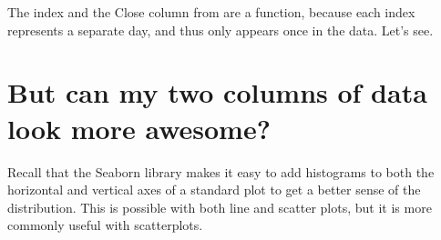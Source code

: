 \documentclass[letterpaper,10pt,english]{jupyterBook}
\begin{document}
\sphinxAtStartPar
{} The index and the Close column from  are a function, because each index represents a separate day, and thus only appears once in the data.  Let’s see.

\begin{sphinxVerbatim}[commandchars=\\\{\}]
  \PYG{p}{[}\PYG{p}{]}   
      
  
  
\end{sphinxVerbatim}

\noindent{}


\section{But can my two columns of data look more awesome?}
\label{\detokenize{chapter-10-visualization:but-can-my-two-columns-of-data-look-more-awesome}}
\sphinxAtStartPar
Recall that the Seaborn library makes it easy to add histograms to both the horizontal and vertical axes of a standard plot to get a better sense of the distribution.  This is possible with both line and scatter plots, but it is more commonly useful with scatterplots.

\begin{sphinxVerbatim}[commandchars=\\\{\}]
   
    
\end{sphinxVerbatim}
\end{document}
